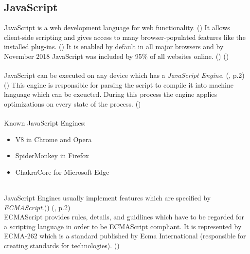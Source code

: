 \subsection{JavaScript}\label{JS}
JavaScript is a web development language for web functionality. (\textcite{wood}) It allows client-side scripting and gives access to many browser-populated features like the installed plug-ins. (\textcite{amiunique}) It is enabled by default in all major browsers and by November 2018 JavaScript was included by 95\% of all websites online. (\textcite{jsinfo}) (\textcite{w3techs18})\\\\
JavaScript can be executed on any device which has a \textit{JavaScript Engine}. (\textcite{mulazzani13}, p.2) (\textcite{jsinfo}) This engine is responsible for parsing the script to compile it into machine language which can be exeucted. During this process the engine applies optimizations on every state of the process. (\textcite{jsinfo})\\\\
Known JavaScript Engines:
\begin{itemize}
	\item V8 in Chrome and Opera
	\item SpiderMonkey in Firefox
	\item ChakraCore for Microsoft Edge\\\\
\end{itemize}
JavaScript Engines usually implement features which are specified by \textit{ECMAScript}.(\textcite{jsinfo}) (\textcite{mulazzani13}, p.2)\\
ECMAScript provides rules, details, and guidlines which have to be regarded for a scripting language in order to be ECMAScript compliant. It is represented by ECMA-262 which is a standard published by Ecma International (responsible for creating standards for technologies). (\textcite{aranda17})\\\\
